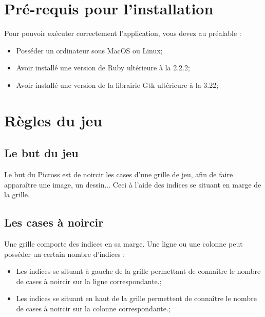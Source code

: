 \documentclass[a4paper, 12pt]{report}
\begin{document}
\begin{titlepage}
\begin{center}
	\end{center}
\end{titlepage}

\renewcommand{\contentsname}{Sommaire}
\tableofcontents
\thispagestyle{empty}
\thispagestyle{plain}



\chapter{Pré-requis pour l'installation}
\thispagestyle{empty}
\thispagestyle{plain}
    
    Pour pouvoir exécuter correctement l'application, vous devez au préalable :
    \begin{itemize}
        \item Posséder un ordinateur sous MacOS ou Linux;
        \item Avoir installé une version de Ruby ultérieure à la 2.2.2;
        \item Avoir installé une version de la librairie Gtk ultérieure à la 3.22;
    \end{itemize}


\chapter{Règles du jeu}
\thispagestyle{empty}
\thispagestyle{plain}


		\section{Le but du jeu}

            Le but du Picross est de noircir les cases d'une grille de jeu, afin de faire apparaître une image, un dessin... Ceci à l'aide des indices se situant en marge de la grille.
            

		\section{Les cases à noircir}
    
            Une grille comporte des indices en sa marge. Une ligne ou une colonne peut posséder un certain nombre d'indices :
            \begin{itemize}
                \item Les indices se situant à gauche de la grille permettant de connaître le nombre de cases à noircir sur la ligne correspondante.;
                \item Les indices se situant en haut de la grille permettent de connaître le nombre de cases à noircir sur la colonne correspondante.;
            \end{itemize}
	        
\end{document}
